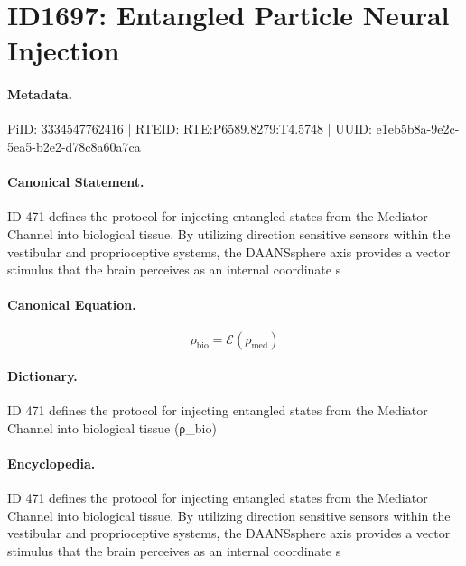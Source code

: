 \section*{ID1697: Entangled Particle Neural Injection}
\paragraph{Metadata.}
PiID: 3334547762416 | RTEID: RTE:P6589.8279:T4.5748 | UUID: e1eb5b8a-9e2c-5ea5-b2e2-d78c8a60a7ca

\paragraph{Canonical Statement.}
ID 471 defines the protocol for injecting entangled states from the Mediator Channel into biological tissue. By utilizing direction sensitive sensors within the vestibular and proprioceptive systems, the DAANSsphere axis provides a vector stimulus that the brain perceives as an internal coordinate s

\paragraph{Canonical Equation.}
\[
\rho_{\mathrm{bio}}=\mathcal{E}(\rho_{\mathrm{med}})
\]

\paragraph{Dictionary.}
ID 471 defines the protocol for injecting entangled states from the Mediator Channel into biological tissue (ρ\_bio)

\paragraph{Encyclopedia.}
ID 471 defines the protocol for injecting entangled states from the Mediator Channel into biological tissue. By utilizing direction sensitive sensors within the vestibular and proprioceptive systems, the DAANSsphere axis provides a vector stimulus that the brain perceives as an internal coordinate s
